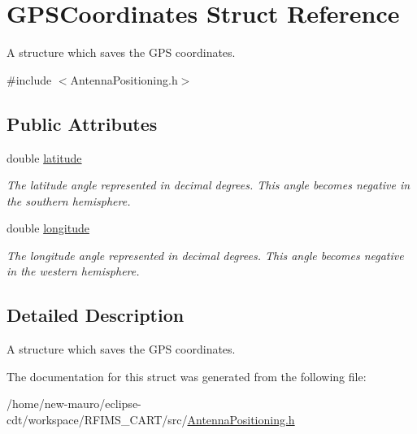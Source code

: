 \hypertarget{structGPSCoordinates}{}\section{G\+P\+S\+Coordinates Struct Reference}
\label{structGPSCoordinates}


A structure which saves the G\+PS coordinates.  




{\ttfamily \#include $<$Antenna\+Positioning.\+h$>$}

\subsection*{Public Attributes}
\begin{DoxyCompactItemize}
\item 
\mbox{\label{structGPSCoordinates_ab4a3d3e2b7e7f5d13a4fe0779ccc2724}} 
double \hyperlink{structGPSCoordinates_ab4a3d3e2b7e7f5d13a4fe0779ccc2724}{latitude}
\begin{DoxyCompactList}\small\item\em The latitude angle represented in decimal degrees. This angle becomes negative in the southern hemisphere. \end{DoxyCompactList}\item 
\mbox{\label{structGPSCoordinates_a1696c867f5a1d459e7a5ea11f43c3f9e}} 
double \hyperlink{structGPSCoordinates_a1696c867f5a1d459e7a5ea11f43c3f9e}{longitude}
\begin{DoxyCompactList}\small\item\em The longitude angle represented in decimal degrees. This angle becomes negative in the western hemisphere. \end{DoxyCompactList}\end{DoxyCompactItemize}


\subsection{Detailed Description}
A structure which saves the G\+PS coordinates. 

The documentation for this struct was generated from the following file\+:\begin{DoxyCompactItemize}
\item 
/home/new-\/mauro/eclipse-\/cdt/workspace/\+R\+F\+I\+M\+S\+\_\+\+C\+A\+R\+T/src/\hyperlink{AntennaPositioning_8h}{Antenna\+Positioning.\+h}\end{DoxyCompactItemize}
